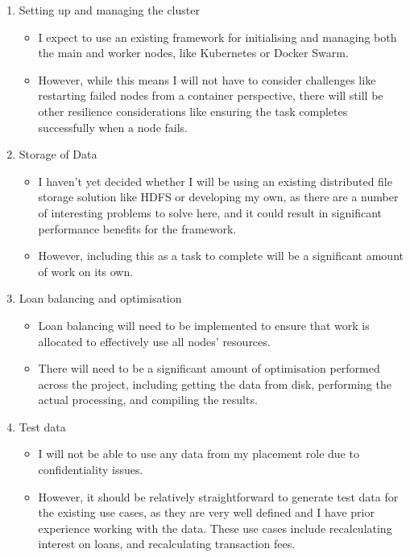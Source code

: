 \documentclass[12pt]{article}
\begin{document}
	\begin{enumerate}
		\item Setting up and managing the cluster
		\begin{itemize}
			\item I expect to use an existing framework for initialising and managing both the main and worker nodes, like Kubernetes or Docker Swarm.
			\item However, while this means I will not have to consider challenges like restarting failed nodes from a container perspective, there will still be other resilience considerations like ensuring the task completes successfully when a node fails.
		\end{itemize}
		\item Storage of Data
		\begin{itemize}
			\item I haven't yet decided whether I will be using an existing distributed file storage solution like HDFS or developing my own, as there are a number of interesting problems to solve here, and it could result in significant performance benefits for the framework.
			\item However, including this as a task to complete will be a significant amount of work on its own.
		\end{itemize}
		\item Loan balancing and optimisation
		\begin{itemize}
			\item Loan balancing will need to be implemented to ensure that work is allocated to effectively use all nodes' resources.
			\item There will need to be a significant amount of optimisation performed across the project, including getting the data from disk, performing the actual processing, and compiling the results.
		\end{itemize}
		\item Test data
		\begin{itemize}
			\item I will not be able to use any data from my placement role due to confidentiality issues.
			\item However, it should be relatively straightforward to generate test data for the existing use cases, as they are very well defined and I have prior experience working with the data. These use cases include recalculating interest on loans, and recalculating transaction fees.
		\end{itemize}
	\end{enumerate}
	
\end{document}
